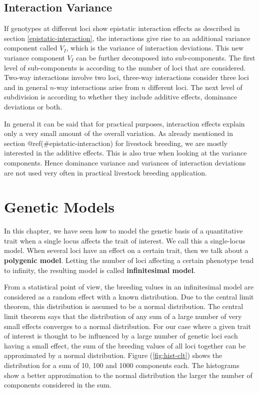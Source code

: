 \documentclass[]{book}
\theoremstyle{definition}
\theoremstyle{definition}
\theoremstyle{definition}
\theoremstyle{remark}
\begin{document}
\hypertarget{interaction-variance}{%
\subsection{Interaction Variance}\label{interaction-variance}}

If genotypes at different loci show epistatic interaction effects as described in section \ref{epistatic-interaction}, the interactions give rise to an additional variance component called \(V_I\), which is the variance of interaction deviations. This new variance component \(V_I\) can be further decomposed into sub-components. The first level of sub-components is according to the number of loci that are considered. Two-way interactions involve two loci, three-way interactions consider three loci and in general \(n\)-way interactions arise from \(n\) different loci. The next level of subdivision is according to whether they include additive effects, dominance deviations or both.

In general it can be said that for practical purposes, interaction effects explain only a very small amount of the overall variation. As already mentioned in section @ref(\#epistatic-interaction) for livestock breeding, we are mostly interested in the additive effects. This is also true when looking at the variance components. Hence dominance variance and variances of interaction deviations are not used very often in practical livestock breeding application.

\hypertarget{genetic-models}{%
\section{Genetic Models}\label{genetic-models}}

In this chapter, we have seen how to model the genetic basis of a quantitative trait when a single locus affects the trait of interest. We call this a single-locus model. When several loci have an effect on a certain trait, then we talk about a \textbf{polygenic model}. Letting the number of loci affecting a certain phenotype tend to infinity, the resulting model is called \textbf{infinitesimal model}.

From a statistical point of view, the breeding values in an infinitesimal model are considered as a random effect with a known distribution. Due to the central limit theorem, this distribution is assumed to be a normal distribution. The central limit theorem says that the distribution of any sum of a large number of very small effects converges to a normal distribution. For our case where a given trait of interest is thought to be influenced by a large number of genetic loci each having a small effect, the sum of the breeding values of all loci together can be approximated by a normal distribution. Figure (\ref{fig:hist-clt}) shows the distribution for a sum of 10, 100 and 1000 components each. The histograms show a better approximation to the normal distribution the larger the number of components considered in the sum.
\end{document}
